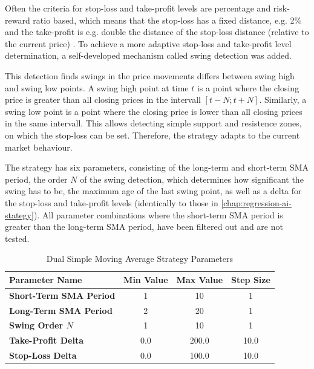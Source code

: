 Often the criteria for stop-loss and take-profit levels are percentage and risk-reward ratio based, which means that the stop-loss has a fixed distance, e.g. 2\% and the take-profit is e.g. double the distance of the stop-loss distance (relative to the current price) \cite{sma-sl-tp}.
To achieve a more adaptive stop-loss and take-profit level determination, a self-developed mechanism called swing detection was added.

This detection finds swings in the price movements differs between swing high and swing low points.
A swing high point at time $t$ is a point where the closing price is greater than all closing prices in the intervall $[t-N; t+N]$.
Similarly, a swing low point is a point where the closing price is lower than all closing prices in the same intervall.
This allows detecting simple support and resistence zones, on which the stop-loss can be set.
Therefore, the strategy adapts to the current market behaviour.



The strategy has six parameters, consisting of the long-term and short-term SMA period, the order $N$ of the swing detection, which determines how significant the swing has to be, the maximum age of the last swing point, as well as a delta for the stop-loss and take-profit levels (identically to those in \autoref{chap:regression-ai-stategy}).
All parameter combinations where the short-term SMA period is greater than the long-term SMA period, have been filtered out and are not tested.

\begin{table}[H]
    \centering
    \begin{tabular}{L{4cm}ccc}
        \toprule
        Parameter Name & Min Value & Max Value & Step Size
        \\
        \midrule
        \textbf{Short-Term SMA Period} & 1   & 10    & 1    \\
        \textbf{Long-Term SMA Period}  & 2   & 20    & 1    \\
        \textbf{Swing Order $N$}       & 1   & 10    & 1    \\
        \textbf{Take-Profit Delta}     & 0.0 & 200.0 & 10.0 \\
        \textbf{Stop-Loss Delta}       & 0.0 & 100.0 & 10.0 \\
        \bottomrule
    \end{tabular}
    \caption{Dual Simple Moving Average Strategy Parameters}
    \label{tbl:sma-strategy-parameters}
\end{table}

